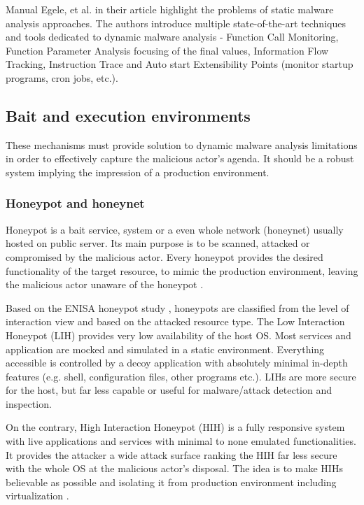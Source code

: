 Manual Egele, et al. in their article \cite{article:malware_analysis_techniques} highlight the problems of static malware analysis approaches. The authors introduce multiple state-of-the-art techniques and tools dedicated to dynamic malware analysis - Function Call Monitoring, Function Parameter Analysis focusing of the final values, Information Flow Tracking, Instruction Trace and Auto start Extensibility Points (monitor startup programs, cron jobs, etc.).

\subsection{Bait and execution environments \label{anal:malware:mech_envs}}
These mechanisms must provide solution to dynamic malware analysis limitations in order to effectively capture the malicious actor's agenda. It should be a robust system implying the impression of a production environment.

\subsubsection*{Honeypot and honeynet \label{anal:malware:mech_envs:hons}}
Honeypot is a bait service, system or a even whole network (honeynet) usually hosted on public server. Its main purpose is to be scanned, attacked or compromised by the malicious actor. Every honeypot provides the desired functionality of the target resource, to mimic the production environment, leaving the malicious actor unaware of the honeypot \cite{study:enisa_honeypots}.

Based on the ENISA honeypot study \cite{study:enisa_honeypots}, honeypots are classified from the level of interaction view and based on the attacked resource type. The Low Interaction Honeypot (LIH) provides very low availability of the host OS. Most services and application are mocked and simulated in a static environment. Everything accessible is controlled by a decoy application with absolutely minimal in-depth features (e.g. shell, configuration files, other programs etc.). LIHs are more secure for the host, but far less capable or useful for malware/attack detection and inspection.

On the contrary, High Interaction Honeypot (HIH) is a fully responsive system with live applications and services with minimal to none emulated functionalities. It provides the attacker a wide attack surface ranking the HIH far less secure with the whole OS at the malicious actor's disposal. The idea is to make HIHs believable as possible and isolating it from production environment including virtualization \cite{blog:first_malware_analysis}.


